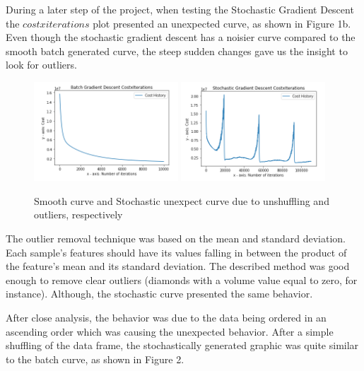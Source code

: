 \documentclass[conference]{IEEEtran}
\begin{document}
    During a later step of the project, when testing the Stochastic Gradient Descent the $cost x iterations$ plot presented an unexpected curve, as shown in Figure 1b. Even though the stochastic gradient descent has a noisier curve compared to the smooth batch generated curve, the steep sudden changes gave us the insight to look for outliers.
	
	\begin{figure}[!h]
      \centering
      \includegraphics[width=0.48\textwidth]{images/smooth-gd-curve.png}
      \includegraphics[width=0.48\textwidth]{images/steep-curves-in-stochastic-gd.png}
      \caption{Smooth curve and Stochastic unexpect curve due to unshuffling and outliers, respectively}
      \label{fig1}
  \end{figure}
	
    The outlier removal technique was based on the mean and standard deviation. Each sample's features should have its values falling in between the product of the feature's mean and its standard deviation. The described method was good enough to remove clear outliers (diamonds with a volume value equal to zero, for instance). Although, the stochastic curve presented the same behavior.
    
    After close analysis, the behavior was due to the data being ordered in an ascending order which was causing the unexpected behavior. After a simple shuffling of the data frame, the stochastically generated graphic was quite similar to the batch curve, as shown in Figure 2.
	
\end{document}
